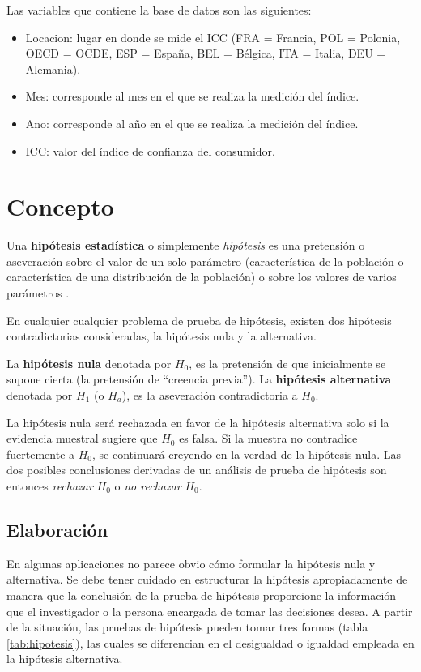 \documentclass[
  11pt,
]{book}
\providecommand{\tightlist}{%
  \setlength{\itemsep}{0pt}\setlength{\parskip}{0pt}}
\theoremstyle{definition}
\theoremstyle{definition}
\theoremstyle{definition}
\theoremstyle{definition}
\theoremstyle{remark}
\begin{document}
Las variables que contiene la base de datos son las siguientes:

\begin{itemize}
\tightlist
\item
  Locacion: lugar en donde se mide el ICC (FRA = Francia, POL = Polonia, OECD = OCDE, ESP = España, BEL = Bélgica, ITA = Italia, DEU = Alemania).
\item
  Mes: corresponde al mes en el que se realiza la medición del índice.
\item
  Ano: corresponde al año en el que se realiza la medición del índice.
\item
  ICC: valor del índice de confianza del consumidor.
\end{itemize}

\section{Concepto}\label{prueba-de-hipotesis-concepto}

Una \textbf{hipótesis estadística} o simplemente \emph{hipótesis} es una pretensión o aseveración sobre el valor de un solo parámetro (característica de la población o característica de una distribución de la población) o sobre los valores de varios parámetros \citep[página 285]{Devore} \citep[página 340]{anderson}.

En cualquier cualquier problema de prueba de hipótesis, existen dos hipótesis contradictorias consideradas, la hipótesis nula y la alternativa.

La \textbf{hipótesis nula} denotada por \(H_0\), es la pretensión de que inicialmente se supone cierta (la pretensión de ``creencia previa''). La \textbf{hipótesis alternativa} denotada por \(H_1\) (o \(H_a\)), es la aseveración contradictoria a \(H_0\).

La hipótesis nula será rechazada en favor de la hipótesis alternativa solo si la evidencia muestral sugiere que \(H_0\) es falsa. Si la muestra no contradice fuertemente a \(H_0\), se continuará creyendo en la verdad de la hipótesis nula. Las dos posibles conclusiones derivadas de un análisis de prueba de hipótesis son entonces \emph{rechazar} \(H_0\) o \emph{no rechazar} \(H_0\).

\subsection{Elaboración}\label{prueba-de-hipotesis-elaboracion}

En algunas aplicaciones no parece obvio cómo formular la hipótesis nula y alternativa. Se debe tener cuidado en estructurar la hipótesis apropiadamente de manera que la conclusión de la prueba de hipótesis proporcione la información que el investigador o la persona encargada de tomar las decisiones desea. A partir de la situación, las pruebas de hipótesis pueden tomar tres formas (tabla \ref{tab:hipotesis}), las cuales se diferencian en el desigualdad o igualdad empleada en la hipótesis alternativa.
\end{document}
